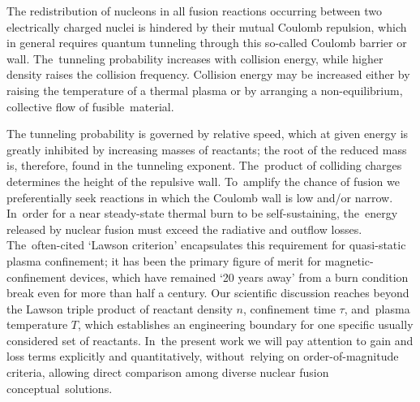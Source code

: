 \documentclass[particles,article,accept,pdftex,moreauthors]{Definitions/mdpi}
\begin{document}
The redistribution of nucleons in all fusion reactions occurring between two electrically charged nuclei is hindered by their mutual Coulomb repulsion, which in general requires quantum tunneling through this so-called Coulomb barrier or wall. The~tunneling probability increases with collision energy, while higher density raises the collision frequency. Collision energy may be increased either by raising the temperature of a thermal plasma or by arranging a non-equilibrium, collective flow of fusible~material.

The tunneling probability is governed by relative speed, which at given energy is greatly inhibited by increasing masses of reactants; the root of the reduced mass is, therefore, found in the tunneling exponent. The~product of colliding charges determines the height of the repulsive wall. To~amplify the chance of fusion we preferentially seek reactions in which the Coulomb wall is low and/or narrow. In~order for a near steady-state thermal burn to be self-sustaining, the~energy released by nuclear fusion must exceed the radiative and outflow losses. The~often-cited `Lawson criterion' encapsulates this requirement for quasi-static plasma confinement; it has been the primary figure of merit for magnetic-confinement devices, which have remained `20 years away' from a burn condition break even for more than half a century. Our scientific discussion reaches beyond the Lawson triple product of reactant density $n$, confinement time $\tau$, and~plasma temperature $T$, which establishes an engineering boundary for one specific usually considered set of reactants. In~the present work we will pay attention to gain and loss terms explicitly and quantitatively, without~relying on order-of-magnitude criteria, allowing direct comparison among diverse nuclear fusion conceptual~solutions.
\end{document}
